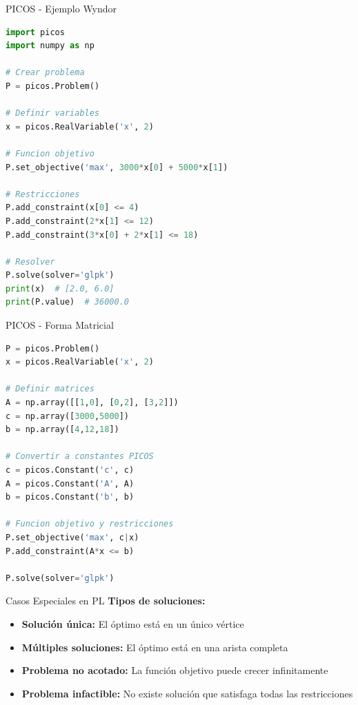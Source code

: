 \documentclass{beamer}
\begin{document}
\begin{frame}[fragile]{PICOS - Ejemplo Wyndor}
    \begin{lstlisting}[language=Python]
import picos
import numpy as np

# Crear problema
P = picos.Problem()

# Definir variables
x = picos.RealVariable('x', 2)

# Funcion objetivo
P.set_objective('max', 3000*x[0] + 5000*x[1])

# Restricciones
P.add_constraint(x[0] <= 4)
P.add_constraint(2*x[1] <= 12)
P.add_constraint(3*x[0] + 2*x[1] <= 18)

# Resolver
P.solve(solver='glpk')
print(x)  # [2.0, 6.0]
print(P.value)  # 36000.0
    \end{lstlisting}
\end{frame}

\begin{frame}[fragile]{PICOS - Forma Matricial}
    \begin{lstlisting}[language=Python]
P = picos.Problem()
x = picos.RealVariable('x', 2)

# Definir matrices
A = np.array([[1,0], [0,2], [3,2]])
c = np.array([3000,5000])
b = np.array([4,12,18])

# Convertir a constantes PICOS
c = picos.Constant('c', c)
A = picos.Constant('A', A)
b = picos.Constant('b', b)

# Funcion objetivo y restricciones
P.set_objective('max', c|x)
P.add_constraint(A*x <= b)

P.solve(solver='glpk')
    \end{lstlisting}
\end{frame}

\begin{frame}{Casos Especiales en PL}
    \textbf{Tipos de soluciones:}
    \begin{itemize}
        \item<1-> \textbf{Solución única:} El óptimo está en un único vértice
        \item<2-> \textbf{Múltiples soluciones:} El óptimo está en una arista completa
        \item<3-> \textbf{Problema no acotado:} La función objetivo puede crecer infinitamente
        \item<4-> \textbf{Problema infactible:} No existe solución que satisfaga todas las restricciones
    \end{itemize}
    
    \vspace{1em}
\end{frame}
\end{document}
